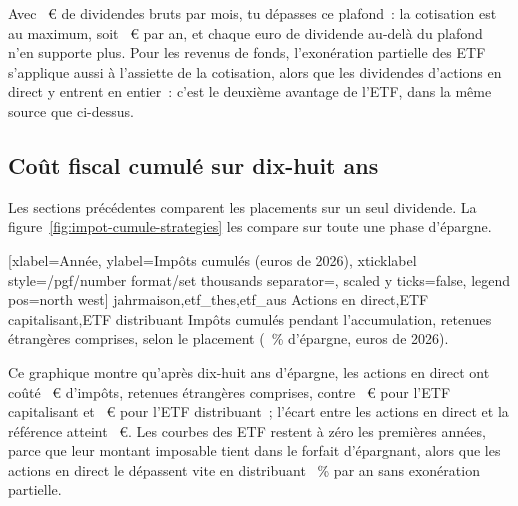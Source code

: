 Avec \BruttoNoetigMois~€ de dividendes bruts par mois, tu d\'epasses ce plafond~: la cotisation est
au maximum, soit \KvPvAnnuel~€ par an, et chaque euro de dividende au-del\`a du plafond n'en supporte
plus. Pour les revenus de fonds, l'exon\'eration partielle des ETF s'applique aussi \`a l'assiette de
la cotisation, alors que les dividendes d'actions en direct y entrent en entier~: c'est le deuxi\`eme
avantage de l'ETF, dans la m\^eme source que ci-dessus.

\subsection{Co\^ut fiscal cumul\'e sur dix-huit ans}\label{sec:fisc-kumuliert}

Les sections pr\'ec\'edentes comparent les placements sur un seul dividende. La
figure~\ref{fig:impot-cumule-strategies} les compare sur toute une phase d'\'epargne.


[xlabel={Ann\'ee}, ylabel={Imp\^ots cumul\'es (euros de 2026)},
  xticklabel style={/pgf/number format/set thousands separator={}}, scaled y ticks=false,
  legend pos=north west]%
  {jahr}{maison,etf_thes,etf_aus}%
  {{Actions en direct},{ETF capitalisant},{ETF distribuant}}%
  {Imp\^ots cumul\'es pendant l'accumulation, retenues \'etrang\`eres comprises, selon le placement
  (\SparquoteZwanzig~\% d'\'epargne, euros de 2026).\label{fig:impot-cumule-strategies}}

Ce graphique montre qu'apr\`es dix-huit ans d'\'epargne, les actions en direct ont co\^ut\'e
\SteuerKumMaison~€ d'imp\^ots, retenues \'etrang\`eres comprises, contre \SteuerKumEtfThes~€ pour l'ETF capitalisant et \SteuerKumEtfAus~€
pour l'ETF distribuant~; l'\'ecart entre les actions en direct et la r\'ef\'erence atteint
\SteuerDifferenzAchtzehn~€. Les courbes des ETF restent \`a z\'ero les premi\`eres ann\'ees, parce que
leur montant imposable tient dans le forfait d'\'epargnant, alors que les actions en direct le
d\'epassent vite en distribuant \RenditeDivMaison~\% par an sans exon\'eration partielle.

